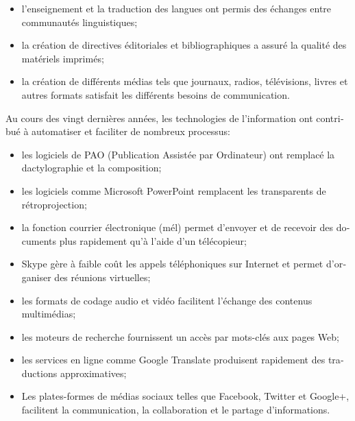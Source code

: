 \begin{french}
\begin{multicols}{2}
\begin{itemize}
\item l'enseignement et la traduction des langues ont permis des
  échanges entre communautés linguistiques;

\item la création de directives éditoriales et bibliographiques a
  assuré la qualité des matériels imprimés;

\item la création de différents médias tels que journaux, radios,
  télévisions, livres et autres formats satisfait les différents
  besoins de communication.

\end{itemize}

Au cours des vingt dernières années, les technologies de
l'information ont contribué à automatiser et faciliter de
nombreux processus:

\begin{itemize}

\item les logiciels de PAO (Publication Assistée par Ordinateur) ont
  remplacé la dactylographie et la composition;

\item les logiciels comme Microsoft PowerPoint remplacent les
  transparents de rétroprojection;

\item la fonction courrier électronique (mél) permet d'envoyer
  et de recevoir des documents plus rapidement qu'à l'aide d'un télécopieur;

\item Skype gère à faible coût les appels téléphoniques sur Internet
  et permet d'organiser des réunions virtuelles;

\item les formats de codage audio et vidéo facilitent l'échange des
  contenus multimédias;

\item les moteurs de recherche fournissent un accès par mots-clés aux
  pages Web;

\item les services en ligne comme Google Translate produisent rapidement des
  traductions approximatives;

\item Les plates-formes de médias sociaux telles que Facebook, Twitter
  et Google+, facilitent la communication, la collaboration et le
  partage d'informations.

\end{itemize}


\end{multicols}
\end{french}
